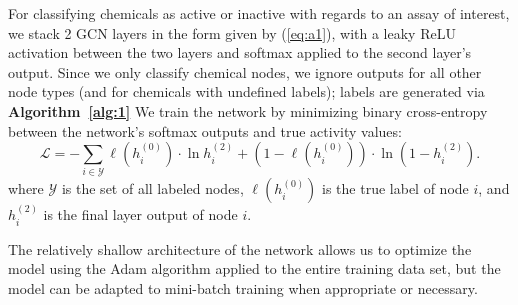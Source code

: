 \documentclass{ws-procs11x85}
\begin{document}
\label{NC}
For classifying chemicals as active or inactive with regards to an assay of interest, we stack 2 GCN layers in the form given by (\ref{eq:a1}), with a leaky ReLU activation between the two layers and softmax applied to the second layer's output.
Since we only classify chemical nodes, we ignore outputs for all other node types (and for chemicals with undefined labels); labels are generated via \textbf{Algorithm~\ref{alg:1}}
We train the network by minimizing binary cross-entropy between the network's softmax outputs and true activity values:
\begin{equation}
   \mathcal{L} = -\sum_{i\in\mathcal{Y}}
   \ell(h_i^{(0)}) \cdot\ln h_{i}^{(2)} +
   (1 - \ell(h_i^{(0)})) \cdot\ln (1 - h_{i}^{(2)}).\label{eq:b1}
\end{equation}
where $\mathcal{Y}$ is the set of all labeled nodes, $\ell(h_i^{(0)})$ is the true label of node $i$, and $h_i^{(2)}$ is the final layer output of node $i$.

The relatively shallow architecture of the network allows us to optimize the model using the Adam algorithm applied to the entire training data set, but the model can be adapted to mini-batch training when appropriate or necessary.



\end{document}
